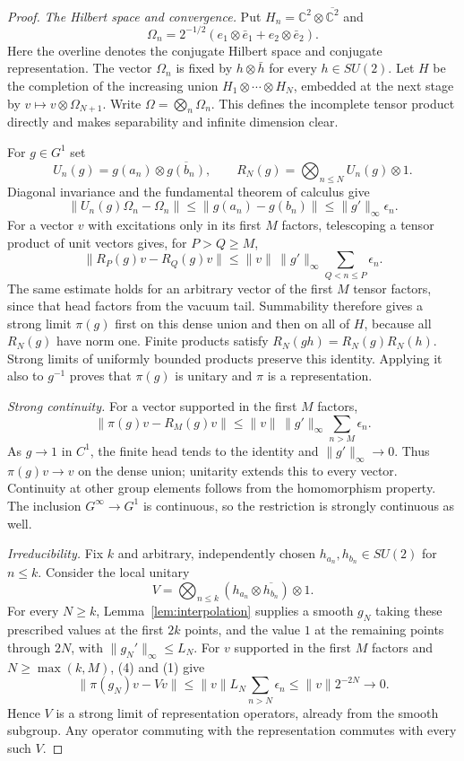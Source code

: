 \begin{proof}
\emph{The Hilbert space and convergence.}
Put $H_n=\mathbb C^2\otimes\overline{\mathbb C^2}$ and
\[
 \Omega_n=2^{-1/2}(e_1\otimes\bar e_1+e_2\otimes\bar e_2).
\]
Here the overline denotes the conjugate Hilbert space and conjugate
representation. The vector $\Omega_n$ is fixed by
$h\otimes\bar h$ for every $h\in SU(2)$. Let $H$ be the completion
of the increasing union $H_1\otimes\cdots\otimes H_N$, embedded at
the next stage by $v\mapsto v\otimes\Omega_{N+1}$. Write
$\Omega=\bigotimes_n\Omega_n$. This defines the incomplete tensor
product directly and makes separability and infinite dimension clear.

For $g\in G^1$ set
\[
 U_n(g)=g(a_n)\otimes\overline{g(b_n)},\qquad
 R_N(g)=\bigotimes_{n\leq N}U_n(g)\otimes1.
\]
Diagonal invariance and the fundamental theorem of calculus give
\[
 \|U_n(g)\Omega_n-\Omega_n\|
 \leq\|g(a_n)-g(b_n)\|\leq\|g'\|_\infty\epsilon_n.
 \tag{3}\label{eq:vacuum-bound}
\]
For a vector $v$ with excitations only in its first $M$ factors,
telescoping a tensor product of unit vectors gives, for $P>Q\geq M$,
\[
 \|R_P(g)v-R_Q(g)v\|
 \leq\|v\|\,\|g'\|_\infty\sum_{Q<n\leq P}\epsilon_n.
\]
The same estimate holds for an arbitrary vector of the first $M$
tensor factors, since that head factors from the vacuum tail.
Summability therefore gives a strong limit $\pi(g)$ first on this
dense union and then on all of $H$, because all $R_N(g)$ have norm
one. Finite products satisfy $R_N(gh)=R_N(g)R_N(h)$.
Strong limits of uniformly bounded products preserve this identity.
Applying it also to $g^{-1}$ proves that $\pi(g)$ is unitary and
$\pi$ is a representation.

\emph{Strong continuity.}
For a vector supported in the first $M$ factors,
\[
 \|\pi(g)v-R_M(g)v\|
 \leq\|v\|\,\|g'\|_\infty\sum_{n>M}\epsilon_n.
 \tag{4}\label{eq:headtail}
\]
As $g\to1$ in $C^1$, the finite head tends to the identity and
$\|g'\|_\infty\to0$. Thus $\pi(g)v\to v$ on the dense union;
unitarity extends this to every vector. Continuity at other group
elements follows from the homomorphism property. The inclusion
$G^\infty\to G^1$ is continuous, so the restriction is strongly
continuous as well.

\emph{Irreducibility.}
Fix $k$ and arbitrary, independently chosen $h_{a_n},h_{b_n}\in SU(2)$
for $n\leq k$. Consider the local unitary
\[
 V=\bigotimes_{n\leq k}
       (h_{a_n}\otimes\overline{h_{b_n}})\otimes1.
\]
For every $N\geq k$, Lemma~\ref{lem:interpolation} supplies a smooth
$g_N$ taking these prescribed values at the first $2k$ points, and
the value $1$ at the remaining points through $2N$, with
$\|g_N'\|_\infty\leq L_N$. For $v$ supported in the first $M$
factors and $N\geq\max(k,M)$, (4) and (1) give
\[
 \|\pi(g_N)v-Vv\|
 \leq\|v\|L_N\sum_{n>N}\epsilon_n
 \leq\|v\|2^{-2N}\longrightarrow0.
\]
Hence $V$ is a strong limit of representation operators, already
from the smooth subgroup. Any operator commuting with the
representation commutes with every such $V$.


\end{proof}
